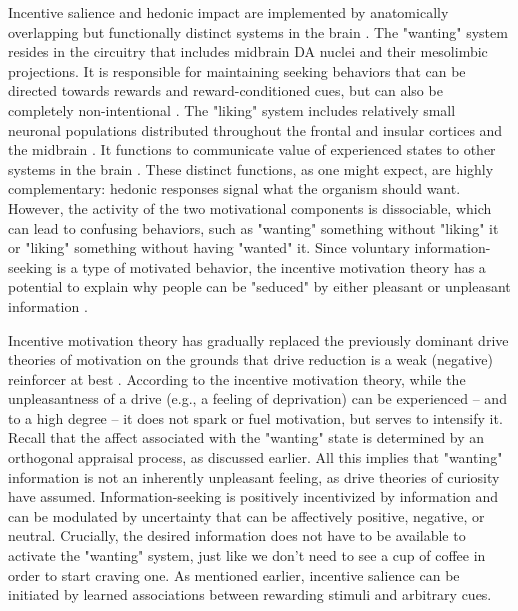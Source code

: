 Incentive salience and hedonic impact are implemented by anatomically overlapping but functionally distinct systems in the brain \cite{berridge_dissecting_2009}. The "wanting" system resides in the circuitry that includes midbrain DA nuclei and their mesolimbic projections. It is responsible for maintaining seeking behaviors that can be directed towards rewards and reward-conditioned cues, but can also be completely non-intentional \cite{berridge_wanting_2009}. The "liking" system includes relatively small neuronal populations distributed throughout the frontal and insular cortices and the midbrain \cite{berridge_pleasure_2015}. It functions to communicate value of experienced states to other systems in the brain \cite{damasio_nature_2013}. These distinct functions, as one might expect, are highly complementary: hedonic responses signal what the organism should want. However, the activity of the two motivational components is dissociable, which can lead to confusing behaviors, such as "wanting" something without "liking" it or "liking" something without having "wanted" it. Since voluntary information-seeking is a type of motivated behavior, the incentive motivation theory has a potential to explain why people can be "seduced" by either pleasant or unpleasant information \cite{fitzgibbon_seductive_2020}.

Incentive motivation theory has gradually replaced the previously dominant drive theories of motivation on the grounds that drive reduction is a weak (negative) reinforcer at best  \cite{berridge_evolving_2018}. According to the incentive motivation theory, while the unpleasantness of a drive (e.g., a feeling of deprivation) can be experienced -- and to a high degree -- it does not spark or fuel motivation, but serves to intensify it. Recall that the affect associated with the "wanting" state is determined by an orthogonal appraisal process, as discussed earlier. All this implies that "wanting" information is not an inherently unpleasant feeling, as drive theories of curiosity \cite{berlyne_theory_1954,loewenstein_psychology_1994} have assumed. Information-seeking is positively incentivized by information and can be modulated by uncertainty that can be affectively positive, negative, or neutral. Crucially, the desired information does not have to be available to activate the "wanting" system, just like we don't need to see a cup of coffee in order to start craving one. As mentioned earlier, incentive salience can be initiated by learned associations between rewarding stimuli and arbitrary cues.

